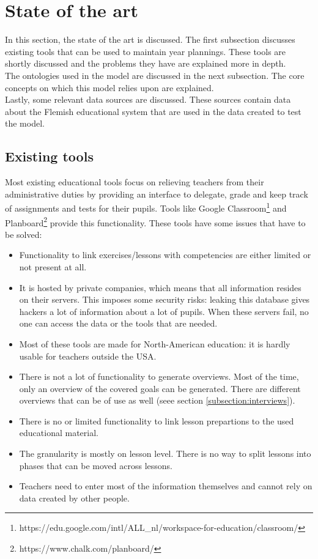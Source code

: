 \documentclass[a4paper]{report}
\begin{document}
    \chapter{State of the art}
    In this section, the state of the art is discussed. The first subsection discusses existing tools that can be used to maintain year plannings. These tools are shortly discussed and the problems they have are explained more in depth.\\
    The ontologies used in the model are discussed in the next subsection. The core concepts on which this model relies upon are explained.\\
    Lastly, some relevant data sources are discussed. These sources contain data about the Flemish educational system that are used in the data created to test the model.
    \section{Existing tools}
    \label{subsection:existingtools}
    Most existing educational tools focus on relieving teachers from their administrative duties by providing an interface to delegate, grade and keep track of assignments and tests for their pupils.
    Tools like Google Classroom\footnote{https://edu.google.com/intl/ALL\_nl/workspace-for-education/classroom/} and Planboard\footnote{https://www.chalk.com/planboard/} provide this functionality. These tools have some issues that have to be solved:
    \begin{itemize}
        \item Functionality to link exercises/lessons with competencies are either limited or not present at all.
        \item It is hosted by private companies, which means that all information resides on their servers. This imposes some security risks: leaking this database gives hackers a lot of information about a lot of pupils. When these servers fail, no one can access the data or the tools that are needed.
        \item Most of these tools are made for North-American education: it is hardly usable for teachers outside the USA.
        \item There is not a lot of functionality to generate overviews. Most of the time, only an overview of the covered goals can be generated. There are different overviews that can be of use as well (seee section \ref{subsection:interviews}).
        \item There is no or limited functionality to link lesson prepartions to the used educational material.
        \item The granularity is mostly on lesson level. There is no way to split lessons into phases that can be moved across lessons.
        \item Teachers need to enter most of the information themselves and cannot rely on data created by other people.
    \end{itemize}
\end{document}
